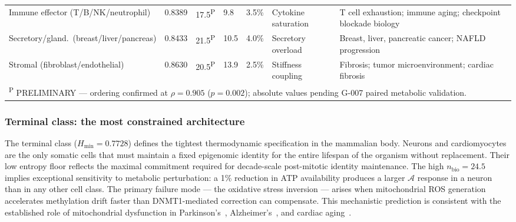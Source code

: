 \documentclass[12pt,a4paper]{article}
\newcommand{\Hmin}{H_{\min}}
\newcommand{\nbio}{n_{\mathrm{bio}}}
\newcommand{\Ascore}{\mathcal{A}}
\begin{document}
\begin{longtable}{p{3.0cm}p{1.1cm}p{1.0cm}p{1.1cm}p{1.3cm}p{2.0cm}p{4.0cm}}
Immune effector (T/B/NK/neu\-tro\-phil) &
  0.8389 & 17.5\textsuperscript{P} & 9.8 & 3.5\% &
  Cytokine saturation &
  T cell exhaustion; immune aging; checkpoint blockade biology\\[4pt]

Secretory/gland.\ (breast/liver/pan\-creas) &
  0.8433 & 21.5\textsuperscript{P} & 10.5 & 4.0\% &
  Secretory overload &
  Breast, liver, pancreatic cancer; NAFLD progression\\[4pt]

Stromal (fibroblast/endothelial) &
  0.8630 & 20.5\textsuperscript{P} & 13.9 & 2.5\% &
  Stiffness coupling &
  Fibrosis; tumor microenvironment; cardiac fibrosis\\[6pt]

\multicolumn{7}{p{16cm}}{\small\textsuperscript{P} PRELIMINARY --- ordering confirmed at $\rho = 0.905$ ($p = 0.002$); absolute values pending G-007 paired metabolic validation.}
\end{longtable}

\subsubsection{Terminal class: the most constrained architecture}
The terminal class ($\Hmin = 0.7728$) defines the tightest thermodynamic
specification in the mammalian body. Neurons and cardiomyocytes are the only
somatic cells that must maintain a fixed epigenomic identity for the entire
lifespan of the organism without replacement. Their low entropy floor reflects
the maximal commitment required for decade-scale post-mitotic identity
maintenance. The high $\nbio = 24.5$ implies exceptional sensitivity to
metabolic perturbation: a 1\% reduction in ATP availability produces a
larger $\Ascore$ response in a neuron than in any other cell class. The
primary failure mode --- the oxidative stress inversion --- arises when
mitochondrial ROS generation accelerates methylation drift faster than
DNMT1-mediated correction can compensate. This mechanistic prediction
is consistent with the established role of mitochondrial dysfunction in
Parkinson's~\cite{Langston1983}, Alzheimer's~\cite{Wang2014}, and
cardiac aging~\cite{Terman2004}.
\end{document}
